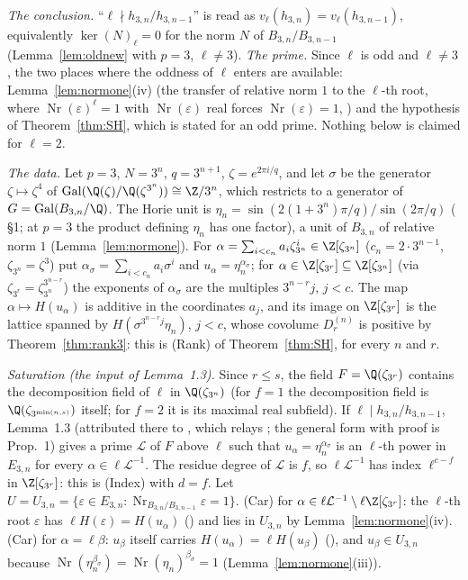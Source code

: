 \emph{The conclusion.} ``$\ell\nmid h_{3,n}/h_{3,n-1}$'' is read as $v_\ell(h_{3,n})=v_\ell(h_{3,n-1})$, equivalently $\ker(N)_\ell=0$ for the norm $N$ of $B_{3,n}/B_{3,n-1}$ (Lemma~\ref{lem:oldnew} with $p=3$, $\ell\ne3$). \emph{The prime.} Since $\ell$ is odd and $\ell\ne3$, the two places where the oddness of $\ell$ enters are available: Lemma~\ref{lem:normone}(iv) (the transfer of relative norm $1$ to the $\ell$-th root, where $\operatorname{Nr}(\varepsilon)^{\ell}=1$ with $\operatorname{Nr}(\varepsilon)$ real forces $\operatorname{Nr}(\varepsilon)=1$, ) and the hypothesis of Theorem~\ref{thm:SH}, which is stated for an odd prime. Nothing below is claimed for $\ell=2$.

\emph{The data.} Let $p=3$, $N=3^n$, $q=3^{n+1}$, $\zeta=e^{2\pi i/q}$, and let $\sigma$ be the generator $\zeta\mapsto\zeta^{4}$ of $\operatorname{Gal}(\Q(\zeta)/\Q(\zeta^{3^n}))\cong\Z/3^n$, which restricts to a generator of $G=\operatorname{Gal}(B_{3,n}/\Q)$. The Horie unit is $\eta_n=\sin(2(1+3^n)\pi/q)/\sin(2\pi/q)$ (\cite{MO13} \S1; at $p=3$ the product defining $\eta_n$ has one factor), a unit of $B_{3,n}$ of relative norm $1$ (Lemma~\ref{lem:normone}). For $\alpha=\sum_{i<c_n}a_i\zeta_{3^n}^i\in\Z[\zeta_{3^n}]$ ($c_n=2\cdot3^{n-1}$, $\zeta_{3^n}=\zeta^3$) put $\alpha_\sigma=\sum_{i<c_n}a_i\sigma^i$ and $u_\alpha=\eta_n^{\alpha_\sigma}$; for $\alpha\in\Z[\zeta_{3^r}]\subseteq\Z[\zeta_{3^n}]$ (via $\zeta_{3^r}=\zeta_{3^n}^{3^{n-r}}$) the exponents of $\alpha_\sigma$ are the multiples $3^{n-r}j$, $j<c$. The map $\alpha\mapsto H(u_\alpha)$ is additive in the coordinates $a_j$, and its image on $\Z[\zeta_{3^r}]$ is the lattice spanned by $H(\sigma^{3^{n-r}j}\eta_n)$, $j<c$, whose covolume $D_r^{(n)}$ is positive by Theorem~\ref{thm:rank3}: this is (Rank) of Theorem~\ref{thm:SH}, for every $n$ and $r$.

\emph{Saturation (the input of \cite{MO13} Lemma~1.3).} Since $r\le s$, the field $F=\Q(\zeta_{3^r})$ contains the decomposition field of $\ell$ in $\Q(\zeta_{3^n})$ (for $f=1$ the decomposition field is $\Q(\zeta_{3^{\min(n,s)}})$ itself; for $f=2$ it is its maximal real subfield). If $\ell\mid h_{3,n}/h_{3,n-1}$, \cite{MO13} Lemma~1.3 (attributed there to \cite{Ho05b}, which relays \cite{Ho02}; the general form with proof is \cite{Ho05a} Prop.~1) gives a prime $\mathcal L$ of $F$ above $\ell$ such that $u_\alpha=\eta_n^{\alpha_\sigma}$ is an $\ell$-th power in $E_{3,n}$ for every $\alpha\in\ell\mathcal L^{-1}$. The residue degree of $\mathcal L$ is $f$, so $\ell\mathcal L^{-1}$ has index $\ell^{c-f}$ in $\Z[\zeta_{3^r}]$: this is (Index) with $d=f$. Let $U=U_{3,n}=\{\varepsilon\in E_{3,n}:\operatorname{Nr}_{B_{3,n}/B_{3,n-1}}\varepsilon=1\}$. (Car) for $\alpha\in\ell\mathcal L^{-1}\setminus\ell\Z[\zeta_{3^r}]$: the $\ell$-th root $\varepsilon$ has $\ell H(\varepsilon)=H(u_\alpha)$ () and lies in $U_{3,n}$ by Lemma~\ref{lem:normone}(iv). (Car) for $\alpha=\ell\beta$: $u_\beta$ itself carries $H(u_\alpha)=\ell H(u_\beta)$ (), and $u_\beta\in U_{3,n}$ because $\operatorname{Nr}(\eta_n^{\beta_\sigma})=\operatorname{Nr}(\eta_n)^{\beta_\sigma}=1$ (Lemma~\ref{lem:normone}(iii)).

